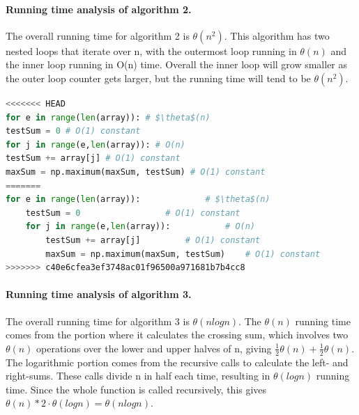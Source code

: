 \documentclass[a4paper,12pt]{article}
\begin{document}
\paragraph{Running time analysis of algorithm 2.} The overall running time for algorithm 2 is $\theta(n^2)$. This algorithm has two nested loops that iterate over n, with the outermost loop running in $\theta(n)$ and the inner loop running in O(n) time. Overall the inner loop will grow smaller as the outer loop counter gets larger, but the running time will tend to be $\theta(n^2)$.
  \begin{lstlisting}[language=python,caption={pseudo code for $n^2$ algorithm},mathescape]
<<<<<<< HEAD
for e in range(len(array)): # $\theta$(n)
testSum = 0 # O(1) constant
for j in range(e,len(array)): # O(n)
testSum += array[j] # O(1) constant
maxSum = np.maximum(maxSum, testSum) # O(1) constant
=======
for e in range(len(array)):				# $\theta$(n)
	testSum = 0					# O(1) constant
	for j in range(e,len(array)):			# O(n)
		testSum += array[j]			# O(1) constant
		maxSum = np.maximum(maxSum, testSum)	# O(1) constant
>>>>>>> c40e6cfea3ef3748ac01f96500a971681b7b4cc8
  \end{lstlisting}

\paragraph{Running time analysis of algorithm 3.} The overall running time for algorithm 3 is $\theta(n log n)$. The $\theta(n)$ running time comes from the portion where it calculates the crossing sum, which involves two $\theta(n)$ operations over the lower and upper halves of n, giving $ \frac{1}{2} \theta(n) + \frac{1}{2} \theta(n)$. The logarithmic portion comes from the recursive calls to calculate the left- and right-sums. These calls divide n in half each time, resulting in $\theta(log n)$ running time. Since the whole function is called recursively, this gives $ \theta(n) * 2 \cdot \theta(log n) = \theta(n log n)$.
\end{document}
